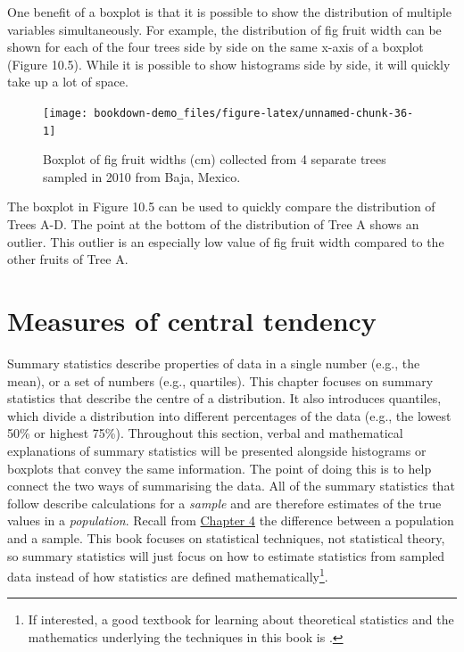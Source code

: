 \documentclass[
  openany]{scrbook}
\begin{document}
One benefit of a boxplot is that it is possible to show the distribution of multiple variables simultaneously.
For example, the distribution of fig fruit width can be shown for each of the four trees side by side on the same x-axis of a boxplot (Figure 10.5).
While it is possible to show histograms side by side, it will quickly take up a lot of space.

\begin{figure}
\texttt{[image: bookdown-demo\_files/figure-latex/unnamed-chunk-36-1]} \caption{Boxplot of fig fruit widths (cm) collected from 4 separate trees sampled in 2010 from Baja, Mexico.}\label{fig:unnamed-chunk-36}
\end{figure}

The boxplot in Figure 10.5 can be used to quickly compare the distribution of Trees A-D.
The point at the bottom of the distribution of Tree A shows an outlier.
This outlier is an especially low value of fig fruit width compared to the other fruits of Tree A.

\hypertarget{Chapter_11}{%
\chapter{Measures of central tendency}\label{Chapter_11}}

Summary statistics describe properties of data in a single number (e.g., the mean), or a set of numbers (e.g., quartiles).
This chapter focuses on summary statistics that describe the centre of a distribution.
It also introduces quantiles, which divide a distribution into different percentages of the data (e.g., the lowest 50\% or highest 75\%).
Throughout this section, verbal and mathematical explanations of summary statistics will be presented alongside histograms or boxplots that convey the same information.
The point of doing this is to help connect the two ways of summarising the data.
All of the summary statistics that follow describe calculations for a \emph{sample} and are therefore estimates of the true values in a \emph{population}.
Recall from \protect\hyperlink{Chapter_4}{Chapter 4} the difference between a population and a sample.
This book focuses on statistical techniques, not statistical theory, so summary statistics will just focus on how to estimate statistics from sampled data instead of how statistics are defined mathematically\footnote{If interested, a good textbook for learning about theoretical statistics and the mathematics underlying the techniques in this book is \citet{Miller2004}.}.
\end{document}
